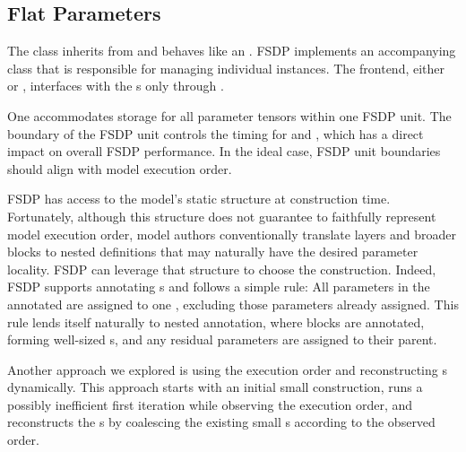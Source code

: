 \subsection{Flat Parameters}

The  class inherits from  and behaves like an . FSDP implements an accompanying  class that is responsible for managing individual  instances. The frontend, either  or , interfaces with the s only through .

One  accommodates storage for all parameter tensors within one FSDP unit. The boundary of the FSDP unit controls the timing for  and , which has a direct impact on overall FSDP performance. In the ideal case, FSDP unit boundaries should align with model execution order. 


FSDP has access to the model's static  structure at construction time. Fortunately, although this structure does not guarantee to faithfully represent model execution order, model authors conventionally translate layers and broader blocks to nested  definitions that may naturally have the desired parameter locality. FSDP can leverage that structure to choose the  construction. Indeed, FSDP supports annotating s and follows a simple rule: All parameters in the annotated  are assigned to one , excluding those parameters already assigned. This rule lends itself naturally to nested annotation, where blocks are annotated, forming well-sized s, and any residual parameters are assigned to their parent. 

Another approach we explored is using the execution order and reconstructing s dynamically. This approach starts with an initial small  construction, runs a possibly inefficient first iteration while observing the execution order, and reconstructs the s by coalescing the existing small s according to the observed order.